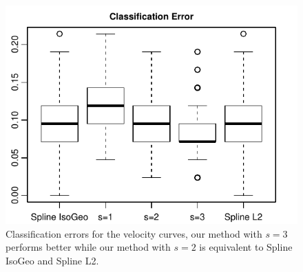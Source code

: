 \begin{figure}[h!]
\centering
\includegraphics[height=0.3\textheight]{./Erreur_classification_velocity.pdf}
\caption{Classification errors for the velocity curves, our method with $s=3$ performs better while our method with $s=2$ is equivalent to Spline IsoGeo and Spline L2.}
\label{fig:class_err_velo}
\end{figure}






 


% 

